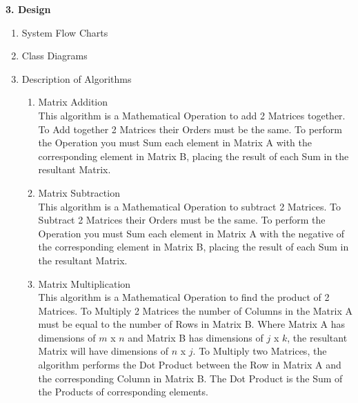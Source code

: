 \begin{flushleft}
    \huge
    \textbf{3. Design}

    \Large
    \begin{enumerate}
        \item {\Large System Flow Charts}
            \large
            \vspace{0.2cm}

        \item {\Large Class Diagrams}
            \large
            \vspace{0.2cm}

        \item {\Large Description of Algorithms}
            \large
            \vspace{0.2cm}
            \begin{enumerate}[label=\arabic*)]
                \item Matrix Addition \\
                This algorithm is a Mathematical Operation to add 2 Matrices together. To Add together 2 Matrices their Orders
                must be the same. To perform the Operation you must Sum each element in Matrix A with the corresponding element 
                in Matrix B, placing the result of each Sum in the resultant Matrix.

                \vspace{0.5cm}
                \item Matrix Subtraction \\
                This algorithm is a Mathematical Operation to subtract 2 Matrices. To Subtract 2 Matrices their Orders
                must be the same. To perform the Operation you must Sum each element in Matrix A with the negative of the 
                corresponding element in Matrix B, placing the result of each Sum in the resultant Matrix.

                \vspace{0.5cm}
                \item Matrix Multiplication \\
                This algorithm is a Mathematical Operation to find the product of 2 Matrices. To Multiply 2 Matrices
                the number of Columns in the Matrix A must be equal to the number of Rows in Matrix B. Where Matrix A has
                dimensions of $m$ x $n$ and Matrix B has dimensions of $j$ x $k$, the resultant Matrix will have dimensions of 
                $n$ x $j$. To Multiply two Matrices, the algorithm performs the Dot Product between the Row in Matrix A and the 
                corresponding Column in Matrix B. The Dot Product is the Sum of the Products of corresponding elements.


\end{enumerate}
\end{enumerate}
\end{flushleft}

